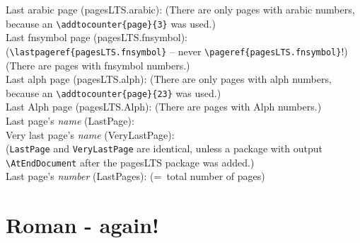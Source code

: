 \documentclass[british]{article}
\def\pagesLTSexampleArabic{3}
\def\pagesLTSexamplealph{23}
\begin{document}
\noindent Last arabic page (pagesLTS.arabic): 
(There are only  pages with arabic numbers,
because an \texttt{\textbackslash addtocounter\{page\}\{\pagesLTSexampleArabic\}} was used.)\\

\noindent Last fnsymbol page (pagesLTS.fnsymbol):  \\
(\texttt{\textbackslash lastpageref\{pagesLTS.fnsymbol\}} -- never
\texttt{\textbackslash pageref\{pagesLTS.fnsymbol\}}!)\\
(There are  pages with fnsymbol numbers.)\\

\noindent Last alph page (pagesLTS.alph): 
(There are only  pages with alph numbers,
because an \texttt{\textbackslash addtocounter\{page\}\{\pagesLTSexamplealph\}} was used.)\\

\noindent Last Alph page (pagesLTS.Alph): 
(There are  pages with Alph numbers.)\\

\noindent Last page's \textit{name} (LastPage): \\

\noindent Very last page's \textit{name} (VeryLastPage): \\
(\texttt{LastPage} and \texttt{VeryLastPage} are identical, unless
a package with output \linebreak
\texttt{\textbackslash AtEndDocument} after the \textsf{pagesLTS} package
was added.)\\

\noindent Last page's \textit{number} (LastPages): 
(=~total number of pages)\\

\lipsum[1-60]

\newpage


\section{Roman - again!\label{Roman2}}
\end{document}
